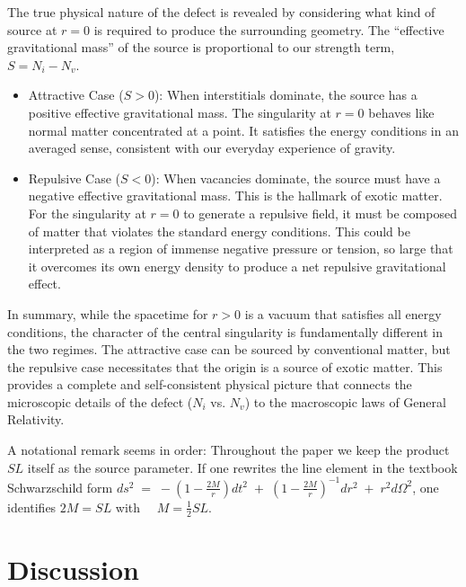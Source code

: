 \documentclass[%
  reprint,
  superscriptaddress,
  showpacs,
  showkeys,
  amsmath,amssymb,
  pra,
  longbibliography,
  floatfix,
]{revtex4-2}
\begin{document}
The true physical nature of the defect is revealed by considering what kind of source at $r=0$ is required to produce the surrounding geometry. The ``effective gravitational mass'' of the source is proportional to our strength term, $S = N_i - N_v$.

\begin{itemize}
    \item {Attractive Case ($S > 0$):}
    When interstitials dominate, the source has a positive effective gravitational mass. The singularity at $r=0$ behaves like normal matter concentrated at a point. It satisfies the energy conditions in an averaged sense, consistent with our everyday experience of gravity.

    \item {Repulsive Case ($S < 0$):}
    When vacancies dominate, the source must have a negative effective gravitational mass. This is the hallmark of  exotic matter. For the singularity at $r=0$ to generate a repulsive field, it must be composed of matter that violates the standard energy conditions. This could be interpreted as a region of immense negative pressure or tension, so large that it overcomes its own energy density to produce a net repulsive gravitational effect.
\end{itemize}

In summary, while the spacetime for $r>0$ is a vacuum that satisfies all energy conditions, the character of the central singularity is fundamentally different in the two regimes. The attractive case can be sourced by conventional matter, but the repulsive case necessitates that the origin is a source of exotic matter. This provides a complete and self-consistent physical picture that connects the microscopic details of the defect ($N_i$ vs. $N_v$) to the macroscopic laws of General Relativity.

A notational remark seems in order:
Throughout the paper we keep the product $SL$ itself as the source parameter.
If one rewrites the line element in the textbook Schwarzschild form
$ds^{2} \;=\;
- \left(1-\frac{2M}{r}\right) dt^{2}
\;+\;
\left(1-\frac{2M}{r}\right)^{-1} dr^{2}
\;+\;
r^{2} d\Omega^{2}$,
one identifies
$
2M = SL$ with $\quad M=\tfrac12 SL $.

\section{Discussion}
\label{sec:discuss}
\end{document}
